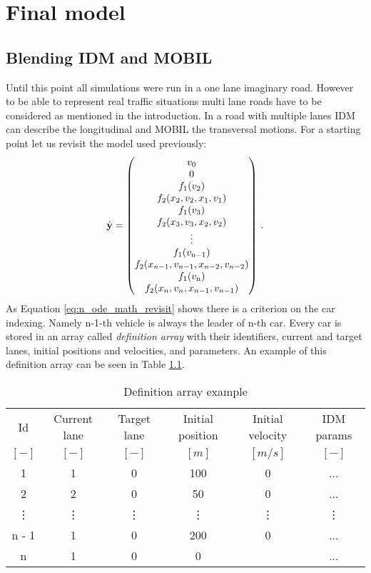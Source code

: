 \chapter{Final model}
	\section{Blending IDM and MOBIL}
		Until this point all simulations were run in a one lane imaginary road. However to be able to represent real traffic situations multi lane roads have to be considered as mentioned in the introduction. In a road with multiple lanes IDM can describe the longitudinal and MOBIL the transversal motions. For a starting point let us revisit the model used previously:
		\begin{equation}
			\dot{\textbf{y}}=
			\begin{pmatrix}
			v_0\\
			0\\
			f_1(v_{2})\\
			f_2(x_{2}, v_{2},x_{1}, v_{1})\\
			f_1(v_{3})\\
			f_2(x_{3}, v_{3},x_{2}, v_{2})\\
			\vdots\\
			f_1(v_{\rm n-1})\\
			f_2(x_{n-1}, v_{n-1},x_{n-2}, v_{n-2})\\
			f_1(v_{\rm n})\\
			f_2(x_{n}, v_{n},x_{n-1}, v_{n-1})
			\end{pmatrix}\,.
			\label{eq:n_ode_math_revisit}
		\end{equation}
		As Equation \ref{eq:n_ode_math_revisit} shows there is a criterion on the car indexing.  Namely n-1-th vehicle is always the leader of n-th car. Every car is stored in an array called \textit{definition array} with their identifiers,  current and target lanes, initial positions and velocities, and parameters. An example of this definition array can be seen in Table \ref{tab:definition_array}.
		\begin{table}
			\begin{center}
				\begin{tabular}{ |c|c|c|c|c|c| }
					\hline
					Id & Current lane & Target lane & Initial position & Initial velocity& IDM params\\
					$[-]$ & $[-]$ & $[-]$ & $[m]$ & $[m/s]$ & $[-]$\\
					\hline
					1 & 1 & 0 & 100 & 0 & ...\\
					2 & 2 & 0 & 50 & 0 & ...\\
					\vdots & \vdots & \vdots & \vdots & \vdots & \vdots\\
					n - 1 & 1 & 0 & 200 & 0 & ...\\
					n & 1 & 0 & 0 &  & ...\\
					\hline
				\end{tabular}
			\end{center}
			\caption{Definition array example}
			\label{tab:definition_array}
		\end{table}

